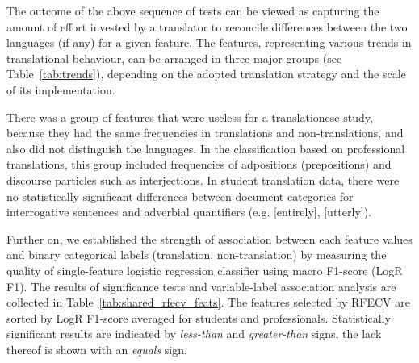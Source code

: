 The outcome of the above sequence of tests can be viewed as capturing the amount of effort invested by a translator to reconcile differences between the two languages (if any) for a given feature. The features, representing various trends in translational behaviour, can be arranged in three major groups (see Table~\ref{tab:trends}), depending on the adopted translation strategy and the scale of its implementation. 

There was a group of features that were useless for a translationese study, because they had the same frequencies in translations and non-translations, and also did not distinguish the languages. In the classification based on professional translations, this group included frequencies of adpositions (prepositions) and discourse particles such as interjections. In student translation data, there were no statistically significant differences between document categories for interrogative sentences and adverbial quantifiers (e.g.  [entirely],   [utterly]).

Further on, we established the strength of association between each feature values and binary categorical labels (translation, non-translation) by measuring the quality of single-feature logistic regression classifier using macro F1-score (LogR F1). The results of significance tests and variable-label association analysis are collected in Table~\ref{tab:shared_rfecv_feats}. The features selected by RFECV are sorted by LogR F1-score averaged for students and professionals. Statistically significant results are indicated by \textit{less-than} and \textit{greater-than} signs, the lack thereof is shown with an \textit{equals} sign.

